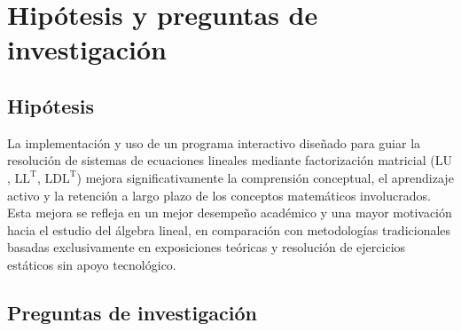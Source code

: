 \section{Hipótesis y preguntas de investigación}

\subsection{Hipótesis}

\noindent La implementación y uso de un programa interactivo diseñado para guiar la resolución de sistemas de ecuaciones lineales mediante factorización matricial ($\mathrm{LU}$, $\mathrm{LL^T}$, $\mathrm{LDL^T}$) mejora significativamente la comprensión conceptual, el aprendizaje activo y la retención a largo plazo de los conceptos matemáticos involucrados. Esta mejora se refleja en un mejor desempeño académico y una mayor motivación hacia el estudio del álgebra lineal, en comparación con metodologías tradicionales basadas exclusivamente en exposiciones teóricas y resolución de ejercicios estáticos sin apoyo tecnológico.

\subsection{Preguntas de investigación}

